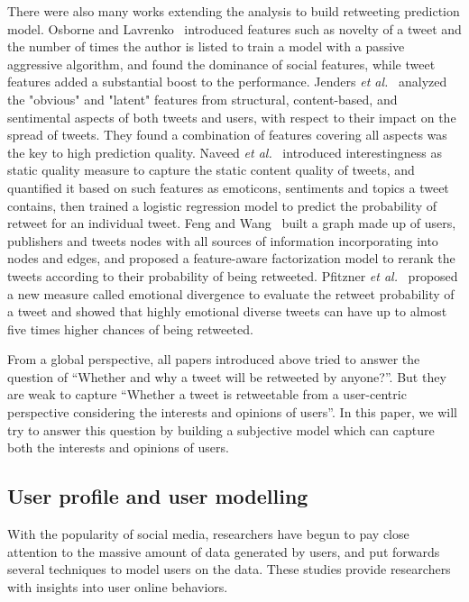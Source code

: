 \documentclass{acm_proc_article-sp}
\begin{document}
There were also many works extending the analysis to build retweeting prediction model. 
Osborne and Lavrenko~\cite{Osborne_Lavrenko_2011} introduced features such as novelty of a tweet and the number of times the author is listed to train a model with a passive aggressive algorithm, and found the dominance of social features, while tweet features added a substantial boost to the performance.
Jenders \emph{et al.}~\cite{Jenders:2013APV} analyzed the "obvious" and "latent" features from structural, content-based, and sentimental aspects of both tweets and users, with respect to their impact on the spread of tweets. 
They found a combination of features covering all aspects was the key to high prediction quality.
Naveed \emph{et al.}~\cite{Naveed:2011SMC,2011:NaveedGKC} introduced interestingness as static quality measure to capture the static content quality of tweets, and quantified it based on such features as emoticons, sentiments and topics a tweet contains, then trained a logistic regression model to predict the probability of retweet for an individual tweet.
Feng and Wang~\cite{conf/wsdm/FengW13} built a graph made up of users, publishers and tweets nodes with all sources of information incorporating into nodes and edges, and proposed a feature-aware factorization model to rerank the tweets according to their probability of being retweeted.
Pfitzner \emph{et al.}~\cite{conf/icwsm/PfitznerGS12} proposed a new measure called emotional divergence to evaluate the retweet probability of a tweet and showed that highly emotional diverse tweets can have up to almost five times higher chances of being retweeted.

From a global perspective, all papers introduced above tried to answer the question of ``Whether and why a tweet will be retweeted by anyone?''. 
But they are weak to capture ``Whether a tweet is retweetable from a user-centric perspective considering the interests and opinions of users''. 
In this paper, we will try to answer this question by building a subjective model which can capture both the interests and opinions of users.

\subsection{User profile and user modelling}
With the popularity of social media, researchers have begun to pay close attention to the massive amount of data generated by users, and put forwards several techniques to model users on the data. These studies provide researchers with insights into user online behaviors. 
\end{document}

